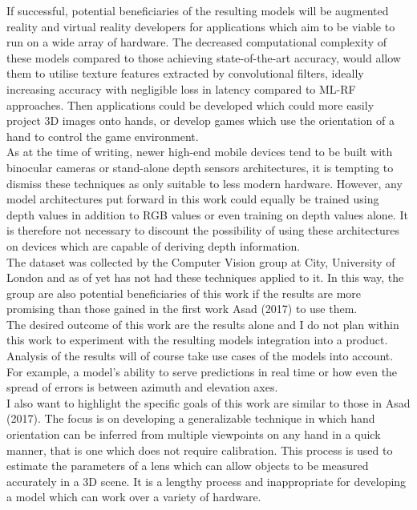 \documentclass{article}
\begin{document}
If successful, potential beneficiaries of the resulting models will be augmented reality and virtual reality developers for applications which aim to be viable to run on a wide array of hardware. The decreased computational complexity of these models compared to those achieving state-of-the-art accuracy, would allow them to utilise texture features extracted by convolutional filters, ideally increasing accuracy with negligible loss in latency compared to ML-RF approaches. Then applications could be developed which could more easily project 3D images onto hands, or develop games which use the orientation of a hand to control the game environment.\\

As at the time of writing, newer high-end mobile devices tend to be built with binocular cameras or stand-alone depth sensors architectures, it is tempting to dismiss these techniques as only suitable to less modern hardware. However, any model architectures put forward in this work could equally be trained using depth values in addition to RGB values or even training on depth values alone. It is therefore not necessary to discount the possibility of using these architectures on devices which are capable of deriving depth information. \\

The dataset was collected by the Computer Vision group at City, University of London and as of yet has not had these techniques applied to it. In this way, the group are also potential beneficiaries of this work if the results are more promising than those gained in the first work Asad (2017) to use them.\\

The desired outcome of this work are the results alone and I do not plan within this work to experiment with the resulting models integration into a product. Analysis of the results will of course take use cases of the models into account. For example, a model's ability to serve predictions in real time or how even the spread of errors is between azimuth and elevation axes.  \\

I also want to highlight the specific goals of this work are similar to those in Asad (2017). The focus is on developing a generalizable technique in which hand orientation can be inferred from multiple viewpoints on any hand in a quick manner, that is one which does not require calibration. This process is used to estimate the parameters of a lens which can allow objects to be measured accurately in a 3D scene. It is a lengthy process and inappropriate for developing a model which can work over a variety of hardware.\\
\end{document}
